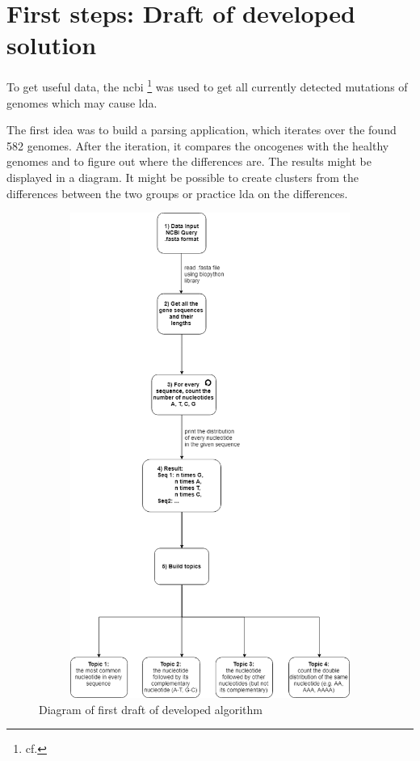 \section{First steps: Draft of developed solution}\label{draft}

To get useful data, the \gls{ncbi} \footnote{cf.\autocite{ncbi}} was used to get all currently detected mutations of genomes which may cause \gls{lda}.

The first idea was to build a parsing application, which iterates over the found 582 genomes. After the iteration, it compares the oncogenes with the healthy genomes and to figure out where the differences are. The results might be displayed in a diagram. It might be possible to create clusters from the differences between the two groups or practice \gls{lda} on the differences.


\begin{figure}[htbp]
	\centering
	\includegraphics[width=1\textwidth, height=600px, keepaspectratio]{Image/creating_topics_algorithm.png}
	\caption{Diagram of first draft of developed algorithm}
	\label{algorithm_figure}
\end{figure}

